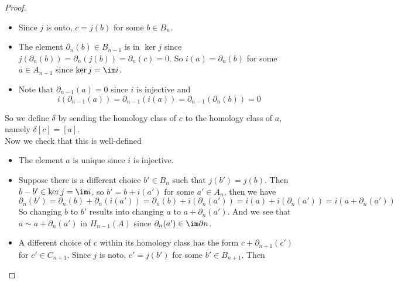 \begin{proof}
\begin{itemize}
	\item Since $j$ is onto, $c=j(b)$ for some $b\in B_n$.
	\item The element $\partial_n(b)\in B_{n-1}$ is in $\ker j$ since $j(\partial_n(b))=\partial_n(j(b))=\partial_n(c)=0$. So $i(a)=\partial_n(b)$ for some $a\in A_{n-1}$ since $\ker j=\im i$.
	\item Note that $\partial_{n-1}(a)=0$ since $i$ is injective and 
	\[i(\partial_{n-1}(a))=\partial_{n-1}(i(a))=\partial_{n-1}(\partial_{n}(b))=0\]
\end{itemize}
So we define $\delta$ by sending the homology class of $c$ to the homology class of $a$, namely $\delta[c]=[a]$.\\
Now we check that this is well-defined
\begin{itemize}
	\item The element $a$ is unique since $i$ is injective.
	\item Suppose there is a different choice $b'\in B_n$ such that $j(b')=j(b)$. Then $b-b'\in \ker j=\im i$, so $b'=b+i(a')$ for some $a'\in A_n$, then we have
	\[\partial_n(b')=\partial_n(b)+\partial_n(i(a'))=\partial_n(b)+i(\partial_n(a'))=i(a)+i(\partial_n(a'))=i(a+\partial_n(a'))\]
	So changing $b$ to $b'$ results into changing $a$ to $a+\partial_n(a')$. And we see that $a\sim a+\partial_n(a')$ in $H_{n-1}(A)$ since $\partial_n(a')\in \im\partial n$.
	\item A different choice of $c$ within its homology class has the form $c+\partial_{n+1}(c')$ for $c'\in C_{n+1}$. Since $j$ is noto, $c'=j(b')$ for some $b'\in B_{n+1}$. Then

\end{itemize}
\end{proof}
